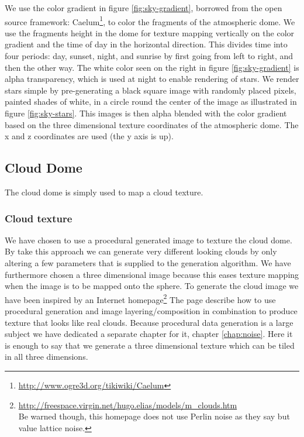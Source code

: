 We use the color gradient in figure
\ref{fig:sky-gradient}, borrowed from the open source framework: 
Caelum\footnote{\url{http://www.ogre3d.org/tikiwiki/Caelum}}, to
color the fragments of the atmospheric dome. We use the
fragments height in the dome for texture mapping vertically on
the color gradient and the time of day in the horizontal
direction. This divides time into four periods: day, sunset, night,
and sunrise by first going from left to right, and then the
other way.
%
The white color seen on the right in figure \ref{fig:sky-gradient}
is alpha transparency, which is used at night to enable rendering of
stars. We render stars simple by pre-generating a black square image
with randomly placed pixels, painted shades of white, in a circle
round the center of the image as illustrated in figure
\ref{fig:sky-stars}. This images is then alpha blended with the color
gradient based on the three dimensional texture coordinates of the
atmospheric dome. The x and z coordinates are used (the y axis is up).

\subsection{Cloud Dome}
The cloud dome is simply used to map a cloud texture.

\subsubsection{Cloud texture}
We have chosen to use a procedural generated image to texture the
cloud dome. By take this approach we can generate very different
looking clouds by only altering a few parameters that is supplied to
the generation algorithm.
%
We have furthermore chosen a three dimensional image because this
eases texture mapping when the image is to be mapped onto the sphere.
%
To generate the cloud image we have been inspired by an Internet
homepage\footnote{\url{http://freespace.virgin.net/hugo.elias/models/m_clouds.htm}
  \\Be warned though, this homepage does not use Perlin noise as they
  say but value lattice noise.}
The page describe how to use procedural generation and
image layering/composition in combination to produce texture that
looks like real clouds.
Because procedural data generation is a large subject we have
dedicated a separate chapter for it, chapter \ref{chap:noise}. Here it
is enough to say that we generate a three dimensional texture which
can be tiled in all three dimensions.

